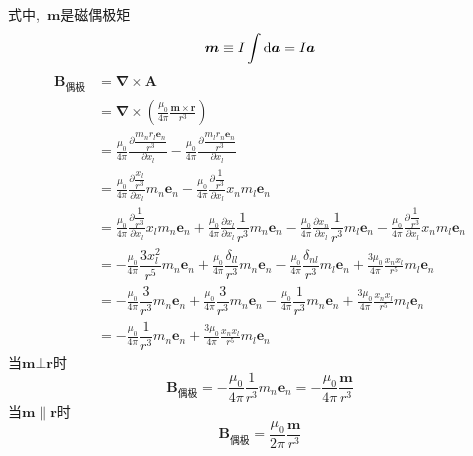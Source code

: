 式中, \,$\boldsymbol{m}$是磁偶极矩
\begin{equation}
    \boldsymbol{m}\equiv I\int\dif\boldsymbol{a}=I\boldsymbol{a}
\end{equation}
\begin{align}
    \boldsymbol{B}_\text{偶极}&=\boldsymbol{\nabla}\times\boldsymbol{A}\nonumber\\
    &=\boldsymbol{\nabla}\times\left(\frac{\mu_0}{4\pi}\frac{\boldsymbol{m}\times\boldsymbol{r}}{r^3}\right)\nonumber\\
    &=\frac{\mu_0}{4\pi}\frac{\partial \dfrac{m_nr_l\boldsymbol{e}_n}{r^3}}{\partial x_l}
    -\frac{\mu_0}{4\pi}\frac{\partial \dfrac{m_lr_n\boldsymbol{e}_n}{r^3}}{\partial x_l}\nonumber\\
    &=\frac{\mu_0}{4\pi}\frac{\partial \dfrac{x_l}{r^3}}{\partial x_l}m_n\boldsymbol{e}_n
    -\frac{\mu_0}{4\pi}\frac{\partial \dfrac{1}{r^3}}{\partial x_l}x_nm_l\boldsymbol{e}_n\nonumber\\
    &=\frac{\mu_0}{4\pi}\frac{\partial \dfrac{1}{r^3}}{\partial x_l}x_lm_n\boldsymbol{e}_n
    +\frac{\mu_0}{4\pi}\frac{\partial x_l}{\partial x_l}\dfrac{1}{r^3}m_n\boldsymbol{e}_n
    -\frac{\mu_0}{4\pi}\frac{\partial x_n}{\partial x_l}\dfrac{1}{r^3}m_l\boldsymbol{e}_n
    -\frac{\mu_0}{4\pi}\frac{\partial \dfrac{1}{r^3}}{\partial x_l}x_nm_l\boldsymbol{e}_n\nonumber\\
    &=-\frac{\mu_0}{4\pi}\dfrac{3x_l^2}{r^5}m_n\boldsymbol{e}_n
    +\frac{\mu_0}{4\pi}\dfrac{\delta_{ll}}{r^3}m_n\boldsymbol{e}_n
    -\frac{\mu_0}{4\pi}\dfrac{\delta_{nl}}{r^3}m_l\boldsymbol{e}_n
    +\frac{3\mu_0}{4\pi}\frac{x_nx_l}{r^5}m_l\boldsymbol{e}_n\nonumber\\
    &=-\frac{\mu_0}{4\pi}\dfrac{3}{r^3}m_n\boldsymbol{e}_n
    +\frac{\mu_0}{4\pi}\dfrac{3}{r^3}m_n\boldsymbol{e}_n
    -\frac{\mu_0}{4\pi}\dfrac{1}{r^3}m_n\boldsymbol{e}_n
    +\frac{3\mu_0}{4\pi}\frac{x_nx_l}{r^5}m_l\boldsymbol{e}_n\nonumber\\
    &=-\frac{\mu_0}{4\pi}\dfrac{1}{r^3}m_n\boldsymbol{e}_n
    +\frac{3\mu_0}{4\pi}\frac{x_nx_l}{r^5}m_l\boldsymbol{e}_n
\end{align}
当$\boldsymbol{m}\bot \boldsymbol{r}$时
\begin{equation}
    \boldsymbol{B}_\text{偶极}=-\frac{\mu_0}{4\pi}\dfrac{1}{r^3}m_n\boldsymbol{e}_n
    =-\frac{\mu_0}{4\pi}\dfrac{\boldsymbol{m}}{r^3}
\end{equation}
当$\boldsymbol{m}\parallel\boldsymbol{r}$时
\begin{equation}
    \boldsymbol{B}_\text{偶极}=\frac{\mu_0}{2\pi}\dfrac{\boldsymbol{m}}{r^3}
\end{equation}
